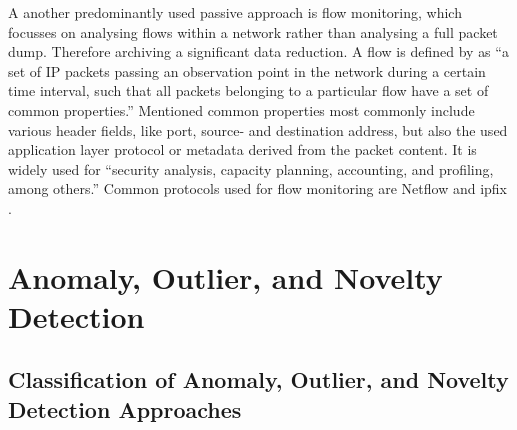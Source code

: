 A another predominantly used passive approach is flow monitoring, which focusses on analysing flows within a network rather than analysing a full packet dump. Therefore archiving a significant data reduction.
A flow is defined by \textcite{Claise2013} as \enquote{a set of IP packets passing an observation point in the network during a certain time interval, such that all packets belonging to a particular flow have a set of common properties.}
Mentioned common properties most commonly include various header fields, like port, source- and destination address, but also the used application layer protocol or metadata derived from the packet content.
It is widely used for \enquote{security analysis, capacity planning, accounting, and profiling, among others.} \parencite{Hofstede2014}
Common protocols used for flow monitoring are Netflow \parencite{Claise2004} and \gls{ipfix} \parencite{Claise2013}.




\section{Anomaly, Outlier, and Novelty Detection}
\label{sec:background:network:novelty}

	\subsection{Classification of Anomaly, Outlier, and Novelty Detection Approaches}
	\label{sec:background:network:novelty:class}
	
